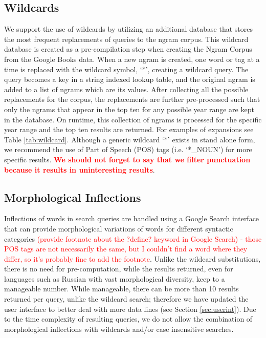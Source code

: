 \documentclass[11pt]{article}
\begin{document}
\subsection{Wildcards}
We support the use of wildcards by utilizing an additional database that stores the most frequent replacements of queries to the ngram corpus. This wildcard database is created as a pre-compilation step when creating the Ngram Corpus from the Google Books data. When a new ngram is created, one word or tag at a time is replaced with the wildcard symbol, `*', creating a wildcard query. The query becomes a key in a string indexed lookup table, and the original ngram is added to a list of ngrams which are its values. After collecting all the possible replacements for the corpus, the replacements are further pre-processed such that only the ngrams that appear in the top ten for any possible year range are kept in the database. On runtime, this collection of ngrams is processed for the specific year range and the top ten results are returned. For examples of expansions see Table \ref{tab:wildcard}. Although a generic wildcard `*' exists in stand alone form, we recommend the use of Part of Speech (POS) tags (i.e. `*\_NOUN') for more specific results.
\textcolor{red}{\bf We should not forget to say that we filter punctuation because it results in uninteresting results}.

\subsection{Morphological Inflections}
Inflections of words in search queries are handled using a Google Search interface that can provide morphological variations of words for different syntactic categories \textcolor{red}{(provide footnote about the ?define? keyword in Google Search) - those POS tags are not necessarily the same, but I couldn't find a word where they differ, so it's probably fine to add the footnote}. Unlike the wildcard substitutions, there is no need for pre-computation, while the results returned, even for languages such as Russian with vast morphological diversity, keep to a manageable number. While manageable, there can be more than 10 results returned per query, unlike the wildcard search; therefore we have updated the user interface to better deal with more data lines (see Section \ref{sec:userint}). Due to the time complexity of resulting queries, we do not allow the combination of morphological inflections with wildcards and/or case insensitive searches.
\end{document}
